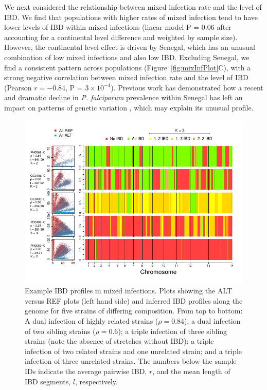 \documentclass[9pt,lineno]{elife}
\begin{document}
We next considered the relationship between mixed infection rate and the level of IBD.  We find that populations with higher rates of mixed infection tend to have lower levels of IBD within mixed infections (linear model P = 0.06 after accounting for a continental level difference and weighted by sample size).  However, the continental level effect is driven by Senegal, which has an unusual combination of low mixed infections and also low IBD.  Excluding Senegal, we find a consistent pattern across populations (Figure~\ref{fig:mixInfPlot}C), with a strong negative correlation between mixed infection rate and the level of IBD (Pearson $r = -0.84$, P = $3\times10^{-4}$).  Previous work has demonstrated how a recent and dramatic decline in \emph{P. falciparum} prevalence within Senegal has left an impact on patterns of genetic variation \citep{Daniels2015}, which may explain its unusual profile.

\begin{figure}[ht]
  \begin{center}
  \includegraphics[width=.9\textwidth]{Fig4.pdf}
    \caption{Example IBD profiles in mixed infections. Plots showing the ALT versus REF plots (left hand side) and inferred IBD profiles along the genome for five strains of differing composition.  From top to bottom: A dual infection of highly related strains ($\rho = 0.84$); a dual infection of two sibling strains ($\rho = 0.6$); a triple infection of three sibling strains (note the absence of stretches without IBD); a triple infection of two related strains and one unrelated strain; and a triple infection of three unrelated strains.  The numbers below the sample IDs indicate the average pairwise IBD, $r$, and the mean length of IBD segments, $l$, respectively.}\label{fig:strainIBD}
    \end{center}
\end{figure}
\end{document}
